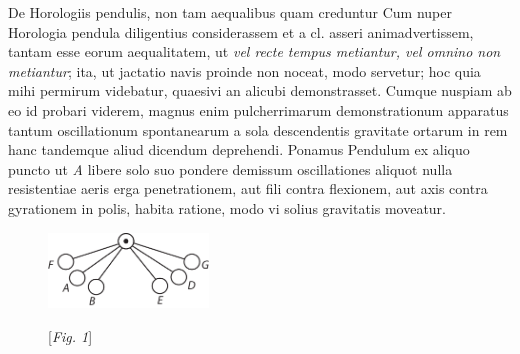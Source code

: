                 \vspace*{8mm}
                \pstart%
\normalsize%
\noindent%
[170~r\textsuperscript{o}]
\pend%
\pstart%
\noindent%
\centering%
De Horologiis pendulis, non tam aequalibus quam creduntur
\pend%
\vspace{0,5em}%
\pstart%
\noindent%
Cum nuper Horologia pendula diligentius considerassem et a cl.
asseri animadvertissem, tantam esse eorum aequalitatem,
ut \textit{vel recte tempus metiantur, vel omnino non metiantur};
ita, ut jactatio navis proinde non noceat, modo
servetur; hoc quia mihi permirum videbatur, quaesivi an alicubi demonstrasset.
Cumque nuspiam ab eo id probari viderem, magnus enim pulcherrimarum
demonstrationum apparatus tantum oscillationum spontanearum a sola descendentis gravitate ortarum
in rem hanc
tandemque aliud
dicendum deprehendi.
\pend
                         \pstart 
                                    Ponamus Pendulum ex aliquo puncto ut \textit{A} libere solo suo pondere demissum oscillationes aliquot
%
{}
nulla resistentiae aeris erga penetrationem, aut fili contra flexionem,
aut axis contra gyrationem in polis, habita ratione, modo vi solius gravitatis moveatur.
  \pend
  \newpage
  \pstart
  \noindent
 \begin{figure} 
 \vspace{-4mm}
 \includegraphics [trim = -3mm 3mm -13mm 0mm, clip, width=0.38\textwidth] {images/lh038_170v.pdf}
\begin{center} [\textit{Fig. 1}]\\
 \end{center}
\end{figure}
